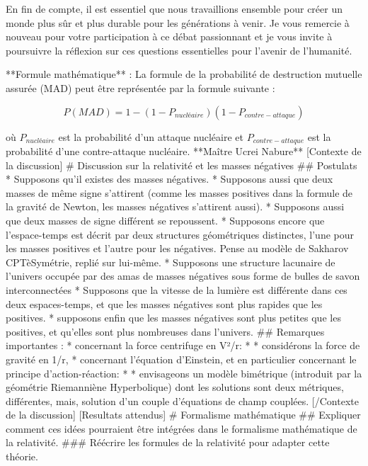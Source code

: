 En fin de compte, il est essentiel que nous travaillions ensemble pour créer un monde plus sûr et plus durable pour les générations à venir. Je vous remercie à nouveau pour votre participation à ce débat passionnant et je vous invite à poursuivre la réflexion sur ces questions essentielles pour l'avenir de l'humanité.

**Formule mathématique** : La formule de la probabilité de destruction mutuelle assurée (MAD) peut être représentée par la formule suivante :

$$P(MAD) = 1 - (1 - P_{nucléaire})(1 - P_{contre-attaque})$$

où $P_{nucléaire}$ est la probabilité d'un attaque nucléaire et $P_{contre-attaque}$ est la probabilité d'une contre-attaque nucléaire.
**Maître Ucrei Nabure**        [Contexte de la discussion]
        # Discussion sur la relativité et les masses négatives
        ## Postulats
        * Supposons qu'il existes des masses négatives. 
        * Supposons aussi que deux masses de même signe s'attirent (comme les masses positives dans la formule de la gravité de Newton, les masses négatives s'attirent aussi). 
        * Supposons aussi que deux masses de signe différent se repoussent. 
        * Supposons encore que l'espace-temps est décrit par deux structures géométriques distinctes, l'une pour les masses positives et l'autre pour les négatives. 
            Pense au modèle de Sakharov CPTèSymétrie, replié sur lui-même.
        * Supposons une structure lacunaire de l’univers occupée par des amas de masses négatives sous forme de bulles de savon interconnectées
        * Supposons que la vitesse de la lumière est différente dans ces deux espaces-temps, et que les masses négatives sont plus rapides que les positives.
        * supposons enfin que les masses négatives sont plus petites que les positives, et qu'elles sont plus nombreuses dans l'univers.
        ## Remarques importantes : 
        * concernant la force centrifuge en V²/r:
        * * considérons la force de gravité en 1/r,  
        * concernant l'équation d'Einstein, et en particulier concernant le principe d'action-réaction:
        * * envisageons un modèle bimétrique (introduit par la géométrie Riemanniène Hyperbolique) dont les solutions sont deux métriques, différentes, mais, solution d'un couple d'équations de champ couplées.
        [/Contexte de la discussion]
        [Resultats attendus]
        # Formalisme mathématique
        ## Expliquer comment ces idées pourraient être intégrées dans le formalisme mathématique de la relativité.
        ### Réécrire les formules de la relativité pour adapter cette théorie.
